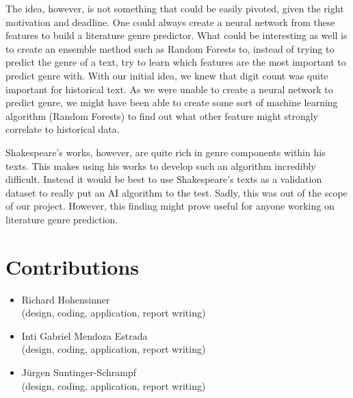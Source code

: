 \documentclass[runningheads]{llncs}
\begin{document}
\begin{python}
The idea, however, is not something that could be easily pivoted, given the right motivation and deadline. One could always create a neural network from these features to build a literature genre predictor. What could be interesting as well is to create an ensemble method such as Random Forests to, instead of trying to predict the genre of a text, try to learn which features are the most important to predict genre with. With our initial idea, we knew that digit count was quite important for historical text. As we were unable to create a neural network to predict genre, we might have been able to create some sort of machine learning algorithm (Random Forests) to find out what other feature might strongly correlate to historical data. 

Shakespeare's works, however, are quite rich in genre components within his texts. This makes using his works to develop such an algorithm incredibly difficult. Instead it would be best to use Shakespeare's texts as a validation dataset to really put an AI algorithm to the test. Sadly, this was out of the scope of our project. However, this finding might prove useful for anyone working on literature genre prediction.
\newpage
\section{Contributions}
\begin{itemize}
  \item Richard Hohensinner \\ (design, coding, application, report writing)
  \item Inti Gabriel Mendoza Estrada \\ (design, coding, application, report writing)
  \item Jürgen Suntinger-Schrampf \\ (design, coding, application, report writing)
\end{itemize}







\end{python}
\end{document}
